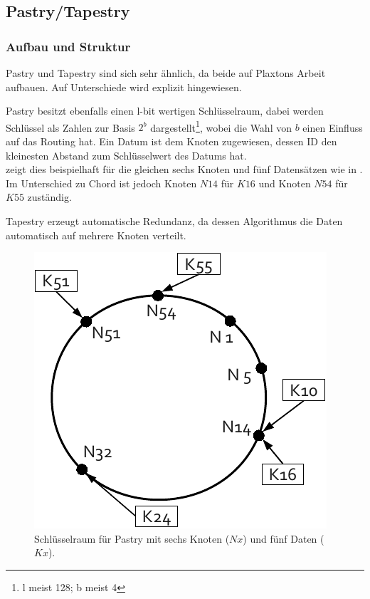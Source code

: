 \subsection{Pastry/Tapestry}
\label{chap:evaluation_pastry}

\subsubsection*{Aufbau und Struktur}
Pastry \cite{Rowstron2001} und Tapestry \cite{Zhao2001Tapestry,Zhao2004Tapestry} sind sich sehr ähnlich, da beide auf Plaxtons Arbeit \cite{Plaxton1997Accessing} aufbauen. Auf Unterschiede wird explizit hingewiesen.

Pastry besitzt ebenfalls einen l-bit wertigen Schlüsselraum, dabei werden Schlüssel als Zahlen zur Basis $2^b$ dargestellt\footnote{l meist 128; b meist 4}, wobei die Wahl von $b$ einen Einfluss auf das Routing hat. Ein Datum ist dem Knoten zugewiesen, dessen ID den kleinesten Abstand zum Schlüsselwert des Datums hat.\\
 zeigt dies beispielhaft für die gleichen sechs Knoten und fünf Datensätzen wie in . Im Unterschied zu Chord ist jedoch Knoten $N14$ für $K16$ und Knoten $N54$ für $K55$ zuständig.

Tapestry erzeugt automatische Redundanz, da dessen Algorithmus die Daten automatisch auf mehrere Knoten verteilt.

\begin{figure}[htbp]
\centering
\includegraphics{grafics/pastry_key_space.pdf}
\caption{Schlüsselraum für Pastry mit sechs Knoten ($Nx$) und fünf Daten ($Kx$).}
\label{fig:pastry_key_space}
\end{figure}

